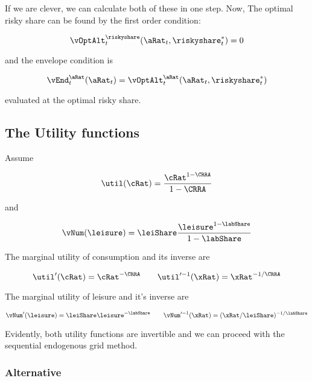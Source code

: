 \documentclass[\econtexRoot/EGMN]{subfiles}
\begin{document}
If we are clever, we can calculate both of these in one step. Now, The optimal risky share can be found by the first order condition:

\begin{equation}
    \vOptAlt_{t}^{\riskyshare}(\aRat_{t}, \riskyshare_{t}^{*})  = 0
\end{equation}

and the envelope condition is

\begin{equation}
    \vEnd_{t}^{\aRat}(\aRat_{t}) = \vOptAlt_{t}^{\aRat}(\aRat_{t}, \riskyshare_{t}^{*})
\end{equation}

evaluated at the optimal risky share.

\subsection{The Utility functions}

Assume

\begin{equation}
    \util(\cRat) = \frac{\cRat^{1-\CRRA}}{1-\CRRA}
\end{equation}

and

\begin{equation}
    \vNum(\leisure) = \leiShare \frac{\leisure^{1-\labShare}}{1-\labShare}
\end{equation}

The marginal utility of consumption and its inverse are

\begin{equation}
    \util'(\cRat) = \cRat^{-\CRRA} \qquad \util'^{-1}(\xRat) =
    \xRat^{-1/\CRRA}
\end{equation}

The marginal utility of leisure and it's inverse are

\begin{equation}
    \vNum'(\leisure) = \leiShare\leisure^{-\labShare} \qquad
    \vNum'^{-1}(\xRat) = (\xRat/\leiShare)^{-1/\labShare}
\end{equation}

Evidently, both utility functions are invertible and we can proceed with the
sequential endogenous grid method.

\subsubsection{Alternative}
\end{document}
